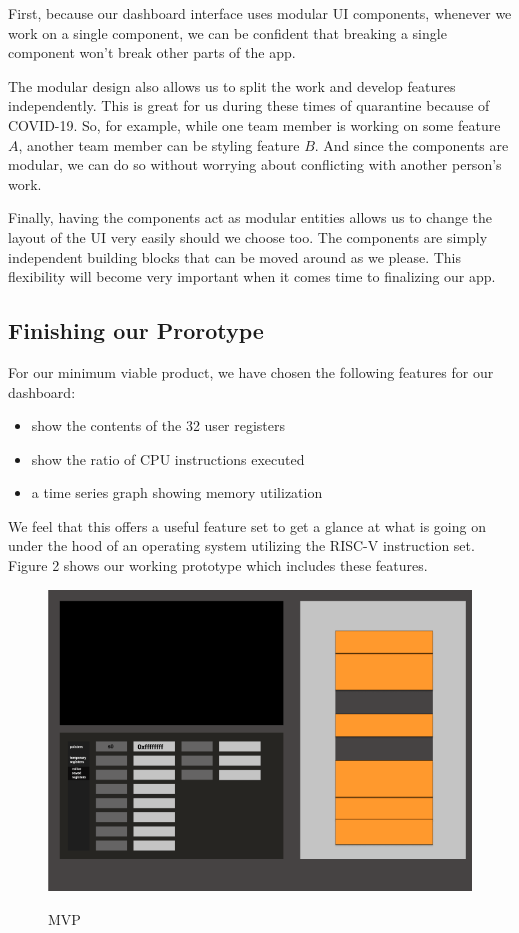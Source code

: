 First, because our dashboard interface uses modular UI components, whenever we work on a single
component, we can be confident that breaking a single component won't break other parts of the app.

The modular design also allows us to split the work and develop features independently. This is great for
us during these times of quarantine because of COVID-19. So, for example, while one team member is working on some feature
$A$, another team member can be styling feature $B$. And since the components are modular, we can do so without
worrying about conflicting with another person's work.

Finally, having the components act as modular entities allows us to change the layout of the UI very easily should
we choose too. The components are simply independent building blocks that can be moved around as we please. This 
flexibility will become very important when it comes time to finalizing our app.

\subsection*{Finishing our Prorotype}

For our minimum viable product, we have chosen the following features for our dashboard:

\begin{itemize}
  \item show the contents of the 32 user registers
  \item show the ratio of CPU instructions executed
  \item a time series graph showing memory utilization
\end{itemize}

We feel that this offers a useful feature set to get a glance at what is going on under the hood
of an operating system utilizing the RISC-V instruction set.
Figure 2 shows our working prototype which includes these features.

\begin{figure}[H]
  \includegraphics[scale=0.3]{prototype1}
  \label{fig:mvp}
  \caption{MVP}
  \centering
\end{figure}

